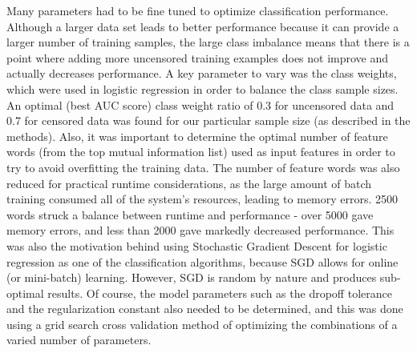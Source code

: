 \documentclass{article} %
\begin{document}
\begin{CJK*}{UTF8}{gbsn}
Many parameters had to be fine tuned to optimize classification performance. Although a larger data set leads to better performance because it can provide a larger number of training samples, the large class imbalance means that there is a point where adding more uncensored training examples does not improve and actually decreases performance. A key parameter to vary was the class weights, which were used in logistic regression in order to balance the class sample sizes. An optimal (best AUC score) class weight ratio of 0.3 for uncensored data and 0.7 for censored data was found for our particular sample size (as described in the methods). Also, it was important to  determine the optimal number of feature words (from the top mutual information list) used as input features in order to try to avoid overfitting the training data. The number of feature words was also reduced for practical runtime considerations, as the large amount of batch training consumed all of the system's resources, leading to memory errors. 2500 words struck a balance between runtime and performance - over 5000 gave memory errors, and less than 2000 gave markedly decreased performance. This was also the motivation behind using Stochastic Gradient Descent for logistic regression as one of the classification algorithms, because SGD allows for online (or mini-batch) learning. However, SGD is random by nature and produces sub-optimal results. Of course, the model parameters such as the dropoff tolerance and the regularization constant also needed to be determined, and this was done using a grid search cross validation method of optimizing the combinations of a varied number of parameters.



\end{CJK*}
\end{document}
